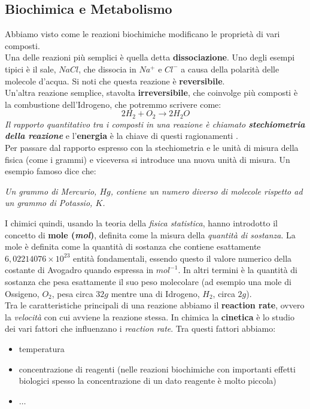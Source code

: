 \documentclass[a4paper,12pt, oneside]{book}
\begin{document}
\subsection{Biochimica e Metabolismo}
Abbiamo visto come le reazioni biochimiche modificano le proprietà di vari
composti. \\
Una delle reazioni più semplici è quella detta \textbf{dissociazione}. Uno degli
esempi tipici è il sale, $NaCl$, che dissocia in $Na^{+}$ e $Cl^{-}$ a causa
della polarità delle molecole d'acqua. Si noti che questa reazione è
\textbf{reversibile}.\\
Un'altra reazione semplice, stavolta \textbf{irreversibile}, che coinvolge più
composti è la combustione dell'Idrogeno, che potremmo scrivere come:
\[2H_2+O_2\to 2H_2O\]
\textit{Il rapporto quantitativo tra i composti in una reazione è chiamato
  \textbf{stechiometria della reazione}} e l'\textbf{energia} è la chiave di
questi ragionamenti .\\
Per passare dal rapporto espresso con la stechiometria e le unità di misura
della fisica (come i grammi) e viceversa si introduce una nuova unità di
misura. Un esempio famoso dice che:
\begin{center}
  \textit{Un grammo di Mercurio, $Hg$, contiene un numero diverso di molecole 
rispetto ad un grammo di Potassio, $K$.}
\end{center}
I chimici quindi, usando la teoria della \textit{fisica statistica}, hanno
introdotto il concetto di \textbf{mole (\textit{mol})}, definita come la misura
della \textit{quantità di sostanza}. La mole è definita come la quantità di
sostanza che contiene esattamente $6,02214076\times 10^{23}$ entità
fondamentali, essendo questo il valore numerico della costante di Avogadro
quando espressa in $mol^{-1}$. In altri termini è la quantità di sostanza che
pesa esattamente il suo peso molecolare (ad esempio una mole di Ossigeno, $O_2$,
pesa circa $32g$ mentre una di Idrogeno, $H_2$, circa $2g$).\\
Tra le caratteristiche principali di una reazione abbiamo il \textbf{reaction
  rate}, ovvero la \textit{velocità} con cui avviene la reazione stessa. In
chimica la \textbf{cinetica} è lo studio dei vari fattori che influenzano i
\textit{reaction rate}. Tra questi fattori abbiamo:
\begin{itemize}
  \item temperatura
  \item concentrazione di reagenti (nelle reazioni biochimiche con importanti
  effetti biologici spesso la concentrazione di un dato reagente è molto
  piccola) 
  \item $\ldots$
\end{itemize}
\end{document}
